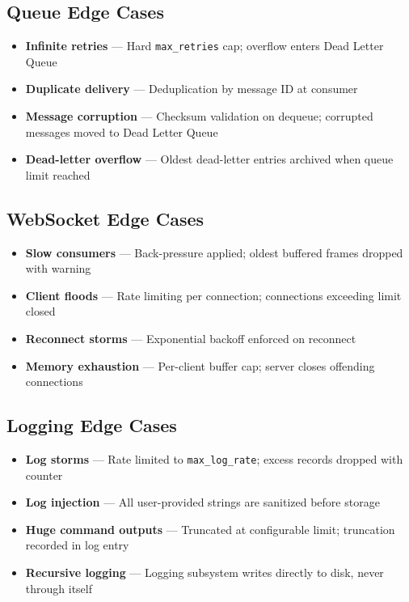 \documentclass[12pt,a4paper]{article}
\begin{document}
\subsection{Queue Edge Cases}

\begin{itemize}[noitemsep]
    \item \textbf{Infinite retries} — Hard \texttt{max\_retries} cap; overflow enters Dead Letter Queue
    \item \textbf{Duplicate delivery} — Deduplication by message ID at consumer
    \item \textbf{Message corruption} — Checksum validation on dequeue; corrupted messages moved to Dead Letter Queue
    \item \textbf{Dead-letter overflow} — Oldest dead-letter entries archived when queue limit reached
\end{itemize}

\subsection{WebSocket Edge Cases}

\begin{itemize}[noitemsep]
    \item \textbf{Slow consumers} — Back-pressure applied; oldest buffered frames dropped with warning
    \item \textbf{Client floods} — Rate limiting per connection; connections exceeding limit closed
    \item \textbf{Reconnect storms} — Exponential backoff enforced on reconnect
    \item \textbf{Memory exhaustion} — Per-client buffer cap; server closes offending connections
\end{itemize}

\subsection{Logging Edge Cases}

\begin{itemize}[noitemsep]
    \item \textbf{Log storms} — Rate limited to \texttt{max\_log\_rate}; excess records dropped with counter
    \item \textbf{Log injection} — All user-provided strings are sanitized before storage
    \item \textbf{Huge command outputs} — Truncated at configurable limit; truncation recorded in log entry
    \item \textbf{Recursive logging} — Logging subsystem writes directly to disk, never through itself
\end{itemize}
\end{document}
